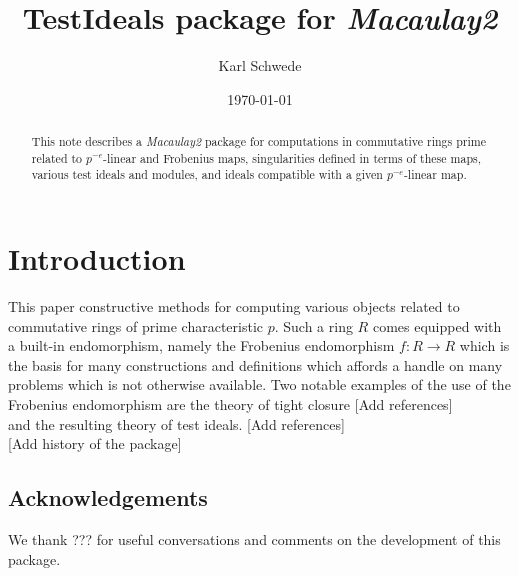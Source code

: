 \documentclass[11pt]{amsart}
\begin{document}
\title{{TestIdeals} package for \emph{Macaulay2}}
\author{Karl Schwede}
\date{\today}
\address{Department of Mathematics, University of Utah, 155 S 1400 E Room 233, Salt Lake City, UT, 84112}

\begin{abstract}
  This note describes a \emph{Macaulay2} package for computations in commutative rings prime related to $p^{-e}$-linear and Frobenius maps,
  singularities defined in terms of these maps,  various test ideals and modules, and ideals compatible with a given $p^{-e}$-linear map.
\end{abstract}




\maketitle

\section{Introduction}

This paper constructive methods for computing various objects related to commutative rings of prime characteristic $p$.
Such a ring $R$ comes equipped with a built-in endomorphism, namely the Frobenius endomorphism $f:R \rightarrow R$ which is the basis for many constructions and definitions
which affords a handle on many problems which is not otherwise available. Two notable examples of the use of the Frobenius endomorphism are the theory of tight closure {\hfill\large\color{red} [Add references]}\\
and the resulting theory of test ideals. {\hfill\large\color{red} [Add references]}\\

{\large\color{red} [Add history of the package]}

\subsection*{Acknowledgements}

We thank ??? for useful conversations and comments on the development of this package.
\end{document}
